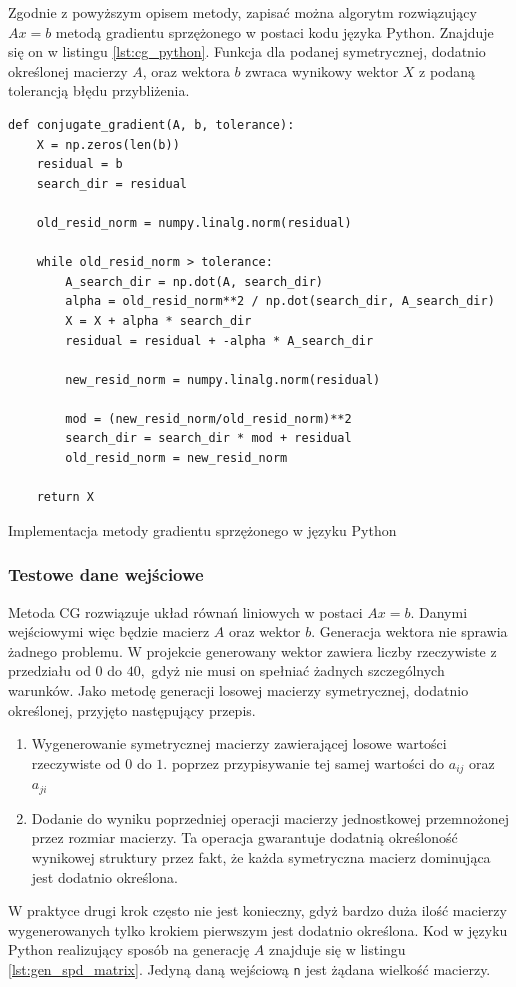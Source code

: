 \documentclass[a4paper,12pt]{book} %
\begin{document}
Zgodnie z powyższym opisem metody, zapisać można algorytm rozwiązujący $Ax = b$ metodą gradientu sprzężonego w postaci kodu języka Python. Znajduje się on w listingu \ref{lst:cg_python}. Funkcja dla podanej symetrycznej, dodatnio określonej macierzy $A$, oraz wektora $b$ zwraca wynikowy wektor $X$ z podaną tolerancją błędu przybliżenia.

\begin{lstfloat}[H]
\lstset{language=Python}
\begin{lstlisting}[frame=single]
def conjugate_gradient(A, b, tolerance):
    X = np.zeros(len(b))
    residual = b
    search_dir = residual

    old_resid_norm = numpy.linalg.norm(residual)

    while old_resid_norm > tolerance:
        A_search_dir = np.dot(A, search_dir)
        alpha = old_resid_norm**2 / np.dot(search_dir, A_search_dir)
        X = X + alpha * search_dir
        residual = residual + -alpha * A_search_dir

        new_resid_norm = numpy.linalg.norm(residual)

        mod = (new_resid_norm/old_resid_norm)**2
        search_dir = search_dir * mod + residual
        old_resid_norm = new_resid_norm

    return X
\end{lstlisting}
\caption{Implementacja metody gradientu sprzężonego w języku Python}
\label{lst:cg_python}
\end{lstfloat}

\subsubsection{Testowe dane wejściowe}
Metoda CG rozwiązuje układ równań liniowych w postaci $Ax = b.$ Danymi wejściowymi więc będzie macierz $A$ oraz wektor $b$. Generacja wektora nie sprawia żadnego problemu. W projekcie generowany wektor zawiera liczby rzeczywiste z przedziału od $0$ do $40,$ gdyż nie musi on spełniać żadnych szczególnych warunków.
Jako metodę generacji losowej macierzy symetrycznej, dodatnio określonej, przyjęto następujący przepis.
\begin{enumerate}
		\item Wygenerowanie symetrycznej macierzy zawierającej losowe wartości rzeczywiste od $0$ do $1.$ poprzez przypisywanie tej samej wartości do $a_{ij}$ oraz $a_{ji}$
		\item Dodanie do wyniku poprzedniej operacji macierzy jednostkowej przemnożonej przez rozmiar macierzy. Ta operacja gwarantuje dodatnią określoność wynikowej struktury przez fakt, że każda symetryczna macierz dominująca jest dodatnio określona.
\end{enumerate}
W praktyce drugi krok często nie jest konieczny, gdyż bardzo duża ilość macierzy wygenerowanych tylko krokiem pierwszym jest dodatnio określona.
Kod w języku Python realizujący sposób na generację $A$ znajduje się w listingu \ref{lst:gen_spd_matrix}. Jedyną daną wejściową \texttt{n} jest żądana wielkość macierzy.
\end{document}
